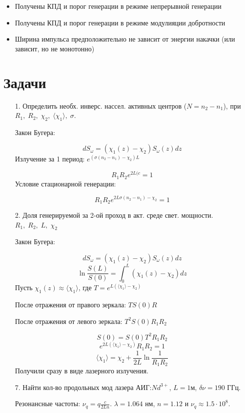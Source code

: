 \documentclass[a4paper]{article}
\begin{document}
\begin{itemize}
	\item Получены КПД и порог генерации в режиме непрерывной генерации
	\item Получены КПД и порог генерации в режиме модулияции добротности
	\item Ширина импульса предположительно не зависит от энергии накачки (или зависит, но не монотонно)
\end{itemize}

\newpage

\section{Задачи}

\begin{itemize}
	\item[1.] Определить необх. инверс. нассел. активных центров ($N=n_2-n_1$), при $R_1,\;R_2,\;\chi_2,\;\langle \chi_1 \rangle,\; \sigma$. \par
		Закон Бугера: \par 
		$$dS_{\omega} = (\chi_1(z) - \chi_2) S_{\omega} (z) dz$$
		Излучение за 1 период: $e^{(\sigma(n_2-n_1)-\chi_2)L}$ \par 
		$$R_1R_2 e^{2L(c} = 1$$
		Условие стационарной генерации: \par 
		$$R_1R_2 e^{2L\sigma(n_2-n_1)-\chi_2} = 1$$
	\item[2.] Доля генерируемой за 2-ой проход в акт. среде свет. мощности. $R_1,\;R_2,\;L,\;\chi_2$ \par 
		Закон Бугера: \par 
		$$dS_{\omega} = (\chi_1(z) - \chi_2) S_{\omega} (z) dz$$
		$$\ln{\frac{S(L)}{S(0)}} = \int_0^L (\chi_1(z) - \chi_2) dz$$
		Пусть $\chi_1(z) \approx \langle \chi_1 \rangle$, где $T = e^{L(\langle \chi_1 \rangle - \chi_2)}$ \par 
		После отражения от правого зеркала: $TS(0)R$ \par 
		После отражения от левого зеркала: $T^2 S(0) R_1R_2$\par 
		$$S(0) = S(0) T^2 R_1R_2$$
		$$e^{2L(\langle \chi_1 \rangle - \chi_2)} R_1R_2 = 1$$
		$$\langle \chi_1 \rangle = \chi_2 + \frac{1}{2L} \ln{\frac{1}{R_1R_2}}$$ Получили сразу в виде лазерного излучения.
	\item[7.] Найти кол-во продольных мод лазера АИГ:$Nd^{3+}$, $L = 1$м, $\delta \nu =  190$ ГГц. \par 
		Резонансные частоты: $\nu_q = q \frac{c}{2Ln}$. $\lambda = 1.064$ нм, $n = 1.12$ и $\nu_q \approx 1.5 \cdot 10^8$.\par 

\end{itemize}
\end{document}
